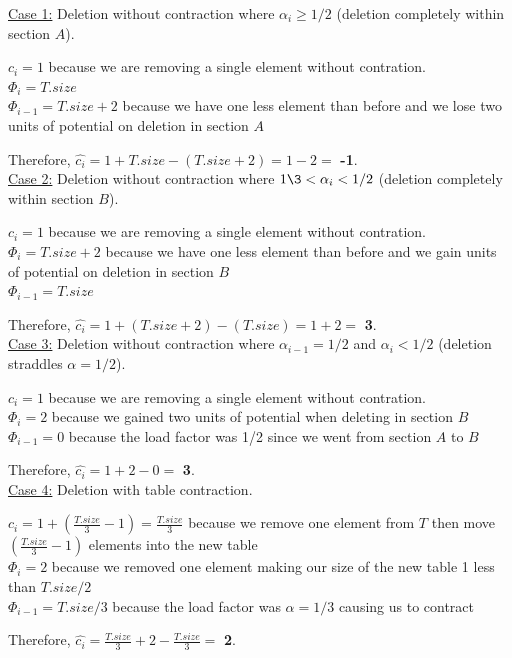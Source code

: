 \documentclass[11pt]{article}
\begin{document}
\underline{Case 1:} Deletion without contraction where $\alpha_i \geq 1/2$ (deletion completely within section $A$).

$c_i = 1$ because we are removing a single element without contration.\\
$\Phi_i = T.size$ \\
$\Phi_{i-1} = T.size + 2$ because we have one less element than before and we lose two units of potential on deletion in section $A$

Therefore, $\hat{c_i} = 1 + T.size - (T.size + 2) = 1 - 2 =$ \textbf{-1}.\\

\underline{Case 2:} Deletion without contraction where $1\3 < \alpha_i < 1/2$ (deletion completely within section $B$).

$c_i = 1$ because we are removing a single element without contration.\\
$\Phi_i = T.size + 2$ because we have one less element than before and we gain units of potential on deletion in section $B$ \\
$\Phi_{i-1} = T.size$

Therefore, $\hat{c_i} = 1 + (T.size + 2) - (T.size) = 1 + 2 =$ \textbf{3}.\\

\underline{Case 3:} Deletion without contraction where $\alpha_{i-1} = 1/2$ and $\alpha_i < 1/2$ (deletion straddles $\alpha = 1/2$).

$c_i = 1$ because we are removing a single element without contration.\\
$\Phi_i = 2$ because we gained two units of potential when deleting in section $B$ \\
$\Phi_{i-1} = 0$ because the load factor was 1/2 since we went from section $A$ to $B$

Therefore, $\hat{c_i} = 1 + 2 - 0 =$ \textbf{3}.\\

\underline{Case 4:} Deletion with table contraction.

$c_i = 1 + (\frac{T.size}{3} - 1) = \frac{T.size}{3}$ because we remove one element from $T$ then move $(\frac{T.size}{3} - 1)$ elements into the new table\\
$\Phi_i = 2$ because we removed one element making our size of the new table 1 less than $T.size / 2$\\
$\Phi_{i-1} = T.size/3$ because the load factor was $\alpha = 1/3$ causing us to contract

Therefore, $\hat{c_i} = \frac{T.size}{3} + 2 - \frac{T.size}{3} =$ \textbf{2}.\\
\end{document}
